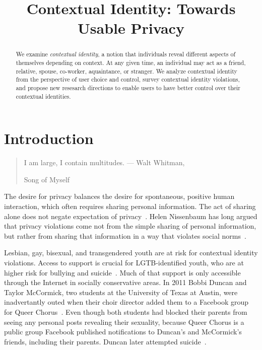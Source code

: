 \documentclass[10pt, conference, compsocconf]{IEEEtran}
\begin{document}
\title{Contextual Identity: Towards Usable Privacy}

\author{
}
\maketitle

\begin{abstract}
We examine \textit{contextual identity}, a notion that individuals reveal
different aspects of themselves depending on context. At any given time,
an individual may act as a friend, relative, spouse, co-worker, aquaintance, or
stranger. We analyze contextual identity from the perspective of user choice
and control, survey contextual identity violations, and propose new resesarch
directions to enable users to have better control over their contextual
identities.
\end{abstract}

\section{Introduction}
\begin{quote}I am large, I contain multitudes. --- Walt Whitman,
\begin{em}Song of Myself\end{em} \end{quote}

The desire for privacy balances the desire for spontaneous, positive human
interaction, which often requires sharing personal information. The act of
sharing alone does not negate expectation of privacy~\cite{boyd2}.
Helen Nissenbaum has long argued that privacy violations come not from the
simple sharing of personal information, but rather from sharing that
information in a way that violates social norms~\cite{nissenbaum}.

Lesbian, gay, bisexual, and transgendered youth are at risk for contextual
identity violations.  Access to support is crucial for LGTB-identified youth,
who are at higher risk for bullying and suicide~\cite{hrc}.
Much of that support is only accessible through the Internet in socially
conservative areas. In 2011 Bobbi Duncan and Taylor McCormick, two
students at the University of Texas at Austin, were inadvertantly outed when
their choir director added them to a Facebook group for Queer
Chorus~\cite{fowler}. Even though both students had blocked their parents from
seeing any personal posts revealing their sexuality, because Queer Chorus is a
public group Facebook published notifications to Duncan's and McCormick's
friends, including their parents. Duncan later attempted suicide~\cite{duncan}.
\end{document}
